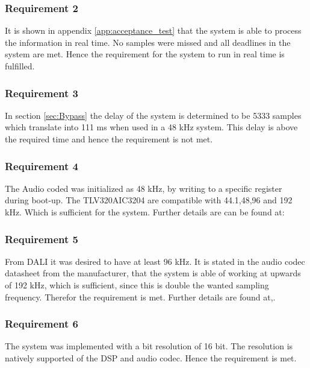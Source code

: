 \subsubsection*{Requirement 2}

It is shown in appendix \ref{app:acceptance_test} that the system is able to process the information in real time. No samples were missed and all deadlines in the system are met. Hence the requirement for the system to run in real time is fulfilled.


\subsubsection*{Requirement 3}

In section \ref{sec:Bypass} the delay of the system is determined to be 5333 samples which translate into 111 ms when used in a 48 kHz system. This delay is above the required time and hence the requirement is not met.

\subsubsection*{Requirement 4}

The Audio coded was initialized as 48 kHz, by writing to a specific register during boot-up. The TLV320AIC3204 are compatible with 44.1,48,96 and 192 kHz. Which is sufficient for the system. Further details are can be found at:


\subsubsection*{Requirement 5}
From DALI it was desired to have at least 96 kHz. It is stated in the audio codec datasheet from the manufacturer, that the system is able of working at upwards of 192 kHz, which is sufficient, since this is double the wanted sampling frequency. Therefor the requirement is met. Further details are found at,.


\subsubsection*{Requirement 6}
The system was implemented with a bit resolution of 16 bit. The resolution is natively supported of the DSP and audio codec. Hence the requirement is met.

\vspace*{-5mm}
